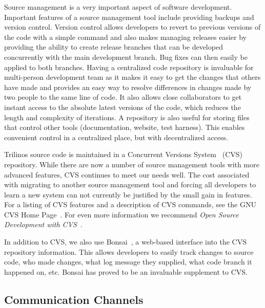 \documentclass[12pt,relax]{article}
\begin{document}

Source management is a very important aspect of software development. 
Important features of a source management tool include providing backups and
version control.  Version control allows developers to revert to previous
versions of the code with a simple command and also makes managing releases
easier by providing the ability to create release branches that can be
developed concurrently with the main development branch.  Bug fixes can then
easily be applied to both branches.  Having a centralized code repository is
invaluable for multi-person development team as it makes it easy to get the
changes that others have made and provides an easy way to resolve differences
in changes made by two people to the same line of code.  It also allows 
close collaborators to get instant access to the absolute latest versions
of the code, which reduces the length and complexity of iterations.  A
repository is also useful for storing files that control other
tools (documentation, website, test harness).  This enables convenient control
in a centralized place, but with decentralized access.

Trilinos source code is maintained in a Concurrent Versions System~\cite{CVS}
(CVS) repository.  While there are now a number of source management tools
with more advanced features, CVS continues to meet our needs well.  The cost
associated with migrating to another source management tool and forcing all
developers to learn a new system can not currently be justified by the small
gain in features.  For a listing of CVS features and a description of 
CVS commands, see the GNU CVS Home Page~\cite{CVS}.  For even more information
we recommend {\it Open Source Development with CVS}~\cite{FogelBarCVS}.

In addition to CVS, we also use Bonsai~\cite{Bonsai}, a web-based interface into the CVS
repository information.  This allows developers to easily track changes to 
source code, who made changes, what log message they supplied, what code branch
it happened on, etc.  Bonsai has proved to be an invaluable supplement to CVS.

\subsection{Communication Channels}

\end{document}
